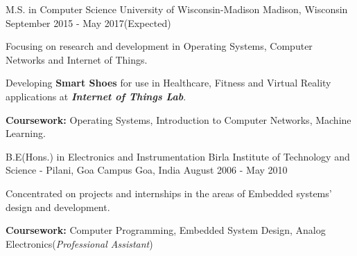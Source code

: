 \begin{cventries}
  \cventry
    {M.S. in Computer Science}
    {University of Wisconsin-Madison}
    {Madison, Wisconsin}
    {September 2015 - May 2017(Expected)}
    {
      \begin{cvitems}
        \item{Focusing on research and development in Operating Systems, Computer Networks and Internet of Things.}
        \item{Developing \textbf{Smart Shoes} for use in Healthcare, Fitness and Virtual Reality applications at \textbf{\textit{Internet of Things Lab}}.}
        \item{\textbf{Coursework:} Operating Systems, Introduction to Computer Networks, Machine Learning.}
      \end{cvitems}
    }
  \cventry
    {B.E(Hons.) in Electronics and Instrumentation}
    {Birla Institute of Technology and Science - Pilani, Goa Campus}
    {Goa, India}
    {August 2006 - May 2010}
    {
      \begin{cvitems}
        \item{Concentrated on projects and internships in the areas of Embedded systems' design and development.}
        \item{\textbf{Coursework:} Computer Programming, Embedded System Design, Analog Electronics(\textit{Professional Assistant})}
      \end{cvitems}
    }
\end{cventries}
